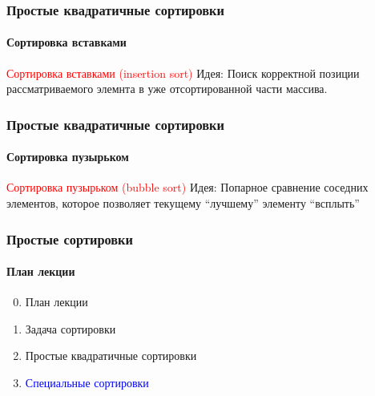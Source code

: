 \documentclass[aspectratio=169]{beamer}
\begin{document}
\begin{frame}
\frametitle{Простые квадратичные сортировки}
\framesubtitle{Сортировка вставками}
\justifying
\small
\textcolor{red}{Сортировка вставками (insertion sort)}\newline\newline
Идея:\newline
Поиск корректной позиции рассматриваемого элемнта в уже отсортированной части массива.

\begin{figure}
    \captionsetup[subfigure]{labelformat=empty}
    \centering
\end{figure}
\end{frame}

\begin{frame}
\frametitle{Простые квадратичные сортировки}
\framesubtitle{Сортировка пузырьком}
\justifying
\textcolor{red}{Сортировка пузырьком (bubble sort)}\newline\newline
Идея:\newline
Попарное сравнение соседних элементов, которое позволяет текущему “лучшему” элементу “всплыть”

\begin{figure}
    \captionsetup[subfigure]{labelformat=empty}
    \centering
\end{figure}
\end{frame}

\begin{frame}
\frametitle{Простые сортировки}
\framesubtitle{План лекции}

\begin{enumerate}
  \setcounter{enumi}{-1}
  \item{План лекции}
  \item{Задача сортировки}
  \item{Простые квадратичные сортировки}
  \item{\textcolor{blue} {Специальные сортировки}}
\end{enumerate}
\end{frame}
\end{document}
